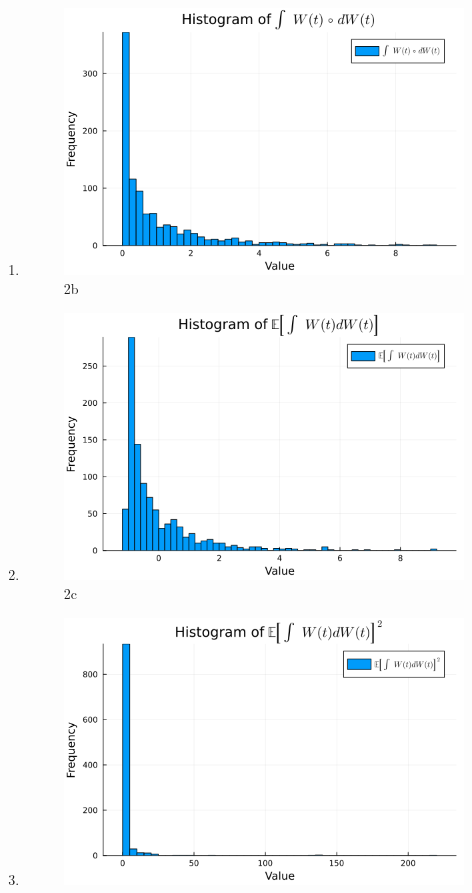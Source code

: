 \documentclass{article}
\begin{document}
\begin{enumerate}
    \item 
        \begin{figure}[H]
            \centering
            \includegraphics[scale=0.6]{imgs/2b.png}
            \caption{2b}
            \label{fig:2b}
        \end{figure}
    \item
        \begin{figure}[H]
            \centering
            \includegraphics[scale=0.6]{imgs/2c.png}
            \caption{2c}
            \label{fig:2c}
        \end{figure}
    \item
        \begin{figure}[H]
            \centering
            \includegraphics[scale=0.6]{imgs/2d.png}

\end{figure}
\end{enumerate}
\end{document}

